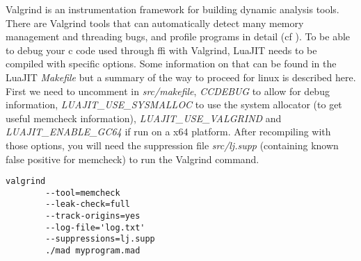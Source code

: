 
Valgrind is an instrumentation framework for building dynamic analysis tools.
There are Valgrind tools that can automatically detect many memory management
and threading bugs, and profile programs in detail (cf \cite{valgrind}). To be
able to debug your c code used through ffi with Valgrind, LuaJIT needs to be
compiled with specific options. Some information on that can be found in the
LuaJIT \emph{Makefile} but a summary of the way to proceed for linux is described
here. First we need to uncomment in \emph{src/makefile}, \emph{CCDEBUG} to
allow for debug information, \emph{LUAJIT\_USE\_SYSMALLOC} to use the system
allocator (to get useful memcheck information), \emph{LUAJIT\_USE\_VALGRIND}
and \emph{LUAJIT\_ENABLE\_GC64} if run on a x64 platform. After recompiling
with those options, you will need the suppression file \emph{src/lj.supp}
(containing known false positive for memcheck) to run the Valgrind command.

\begin{lstlisting}[style=CStyle]
valgrind
		--tool=memcheck
		--leak-check=full
		--track-origins=yes
		--log-file='log.txt'
		--suppressions=lj.supp
		./mad myprogram.mad
\end{lstlisting}



